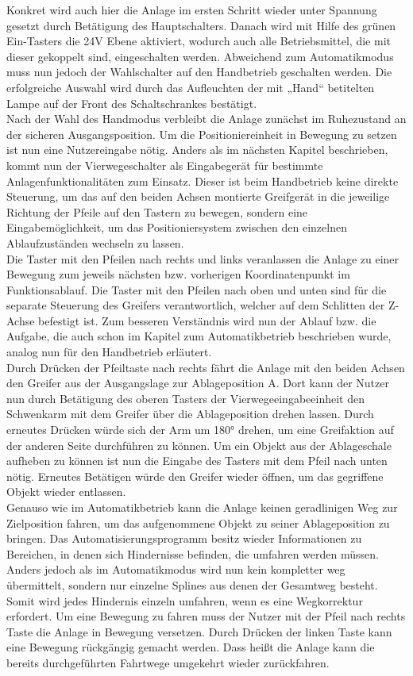 \documentclass[../Bachelorarbeit.tex]{subfiles}
\begin{document}
Konkret wird auch hier die Anlage im ersten Schritt wieder unter Spannung gesetzt durch Betätigung des Hauptschalters. Danach wird mit Hilfe des grünen Ein-Tasters die 24V Ebene aktiviert, wodurch auch alle Betriebsmittel, die mit dieser gekoppelt sind, eingeschalten werden. Abweichend zum Automatikmodus muss nun jedoch der Wahlschalter auf den Handbetrieb geschalten werden. Die erfolgreiche Auswahl wird durch das Aufleuchten der mit „Hand“ betitelten Lampe auf der Front des Schaltschrankes bestätigt.\\
Nach der Wahl des Handmodus verbleibt die Anlage zunächst im Ruhezustand an der sicheren Ausgangsposition. Um die Positioniereinheit in Bewegung zu setzen ist nun eine Nutzereingabe nötig. Anders als im nächsten Kapitel beschrieben, kommt nun der Vierwegeschalter als Eingabegerät für bestimmte Anlagenfunktionalitäten zum Einsatz. Dieser ist beim Handbetrieb keine direkte Steuerung, um das auf den beiden Achsen montierte Greifgerät in die jeweilige Richtung der Pfeile auf den Tastern zu bewegen, sondern eine Eingabemöglichkeit, um das Positioniersystem zwischen den einzelnen Ablaufzuständen wechseln zu lassen.\\
Die Taster mit den Pfeilen nach rechts und links veranlassen die Anlage zu einer Bewegung zum jeweils nächsten bzw. vorherigen Koordinatenpunkt im Funktionsablauf. Die Taster mit den Pfeilen nach oben und unten sind für die separate Steuerung des Greifers verantwortlich, welcher auf dem Schlitten der Z-Achse befestigt ist. Zum besseren Verständnis wird nun der Ablauf bzw. die Aufgabe, die auch schon im Kapitel zum Automatikbetrieb beschrieben wurde, analog nun für den Handbetrieb erläutert.\\
Durch Drücken der Pfeiltaste nach rechts fährt die Anlage mit den beiden Achsen den Greifer aus der Ausgangslage zur Ablageposition A. Dort kann der Nutzer nun durch Betätigung des oberen Tasters der Vierwegeeingabeeinheit den Schwenkarm mit dem Greifer über die Ablageposition drehen lassen. Durch erneutes Drücken würde sich der Arm um 180° drehen, um eine Greifaktion auf der anderen Seite durchführen zu können. Um ein Objekt aus der Ablageschale aufheben zu können ist nun die Eingabe des Tasters mit dem Pfeil nach unten nötig. Erneutes Betätigen würde den Greifer wieder öffnen, um das gegriffene Objekt wieder entlassen.\\
Genauso wie im Automatikbetrieb kann die Anlage keinen geradlinigen Weg zur Zielposition fahren, um das aufgenommene Objekt zu seiner Ablageposition zu bringen. Das Automatisierungsprogramm besitz wieder Informationen zu Bereichen, in denen sich Hindernisse befinden, die umfahren werden müssen. Anders jedoch als im Automatikmodus wird nun kein kompletter weg übermittelt, sondern nur einzelne Splines aus denen der Gesamtweg besteht. Somit wird jedes Hindernis einzeln umfahren, wenn es eine Wegkorrektur erfordert. Um eine Bewegung zu fahren muss der Nutzer mit der Pfeil nach rechts Taste die Anlage in Bewegung versetzen. Durch Drücken der linken Taste kann eine Bewegung rückgängig gemacht werden. Dass heißt die Anlage kann die bereits durchgeführten Fahrtwege umgekehrt wieder zurückfahren.\\
\end{document}
